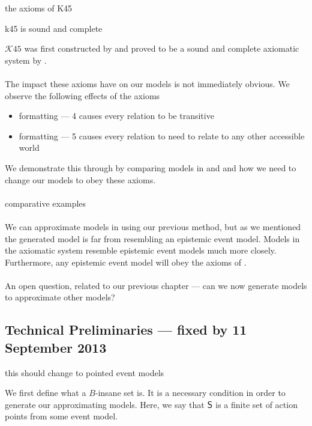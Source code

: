 \begin{lemma} \label{k45axioms}
\FIXME the axioms of K45
\end{lemma}

\begin{lemma} \label{k45SoundComplete}
\FIXME k45 is sound and complete
\end{lemma}

$\mathcal{K}45$ was first constructed by \FIXME and proved to be a sound and complete axiomatic
system by \FIXME.\\
\\
The impact these axioms have on our models is not immediately obvious.
We observe the following effects of the axioms
\begin{itemize}
	\item \FIXME formatting --- 4 causes every relation to be transitive
	\item \FIXME formatting --- 5 causes every relation to need to relate to any other accessible
world
\end{itemize}

We demonstrate this through by comparing models in \AXK and \AXKFF and how we need to change
our models to obey these axioms.\\
\\
\FIXME comparative examples\\
\\
We can approximate models in \AXKFF using our previous method, but as we mentioned
the generated model is far from resembling an epistemic event model.
Models in the axiomatic system \AXKFF resemble epistemic event models much more closely.
Furthermore, any epistemic event model will obey the axioms of \AXKFF.\\
\\
An open question, related to our previous chapter --- can we now generate \AXKFF models to
approximate other \AXKFF models?

\subsection{Technical Preliminaries --- fixed by 11 September 2013}

\FIXME this should change to pointed event models

We first define what a $B$-insane set is.
It is a necessary condition in order to generate our approximating \AXKFF models.
Here, we say that $\mathrm{\mathsf{S}}$ is a finite set of action points from some event model.

